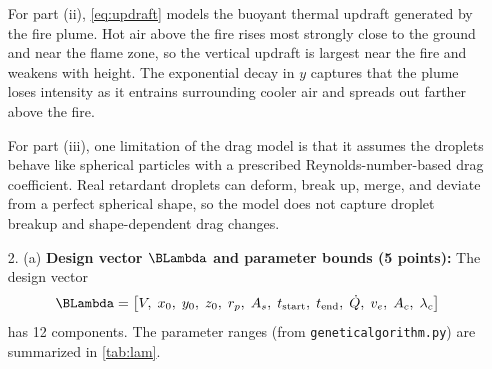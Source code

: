 \documentclass{article}
\begin{document}
\begin{enumerate}
\begin{answer}
For part (ii), \cref{eq:updraft} models the buoyant thermal updraft generated by the fire plume. Hot air above the fire rises most strongly close to the ground and near the flame zone, so the vertical updraft is largest near the fire and weakens with height. The exponential decay in $y$ captures that the plume loses intensity as it entrains surrounding cooler air and spreads out farther above the fire.

For part (iii), one limitation of the drag model is that it assumes the droplets behave like spherical particles with a prescribed Reynolds-number-based drag coefficient. Real retardant droplets can deform, break up, merge, and deviate from a perfect spherical shape, so the model does not capture droplet breakup and shape-dependent drag changes.
\end{answer}



\newpage

\item[2. (a)] \textbf{Design vector $\BLambda$ and parameter bounds (5 points):}
The design vector
\begin{equation}
    \BLambda = \bigl[V,\; x_0,\; y_0,\; z_0,\; r_p,\; A_s,\; t_\text{start},\; t_\text{end},\; \dot{Q},\; v_e,\; A_c,\; \lambda_c\bigr]
    \label{eq:lam}
\end{equation}
has 12 components.
The parameter ranges (from \texttt{geneticalgorithm.py}) are summarized in \cref{tab:lam}.


\end{enumerate}
\end{document}
